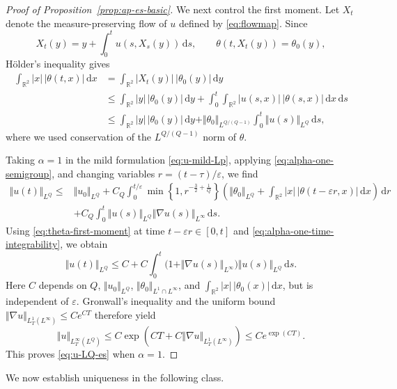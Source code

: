 \documentclass[reqno,11pt,a4paper]{amsart}
\newcommand{\dd}{\mathrm{d}}
\begin{document}
\begin{proof}[Proof of Proposition~\ref{prop:ap-es-basic}]
We next control the first moment.
Let $X_t$ denote the measure-preserving flow of $u$
defined by \eqref{eq:flowmap}. Since
\[
  X_t(y)=y+\int_0^t u(s,X_s(y))\,\dd s,
  \qquad
  \theta(t,X_t(y))=\theta_0(y),
\]
H\"older's inequality gives
\begin{equation}\label{eq:theta-first-moment}
\begin{aligned}
  \int_{\mathbb R^2}|x|\,|\theta(t,x)|\,\dd x
  &=
  \int_{\mathbb R^2}|X_t(y)|\,|\theta_0(y)|\,\dd y
  \\
  &\leq
  \int_{\mathbb R^2}|y|\,|\theta_0(y)|\,\dd y
  +\int_0^t\int_{\mathbb R^2}
    |u(s,x)|\,|\theta(s,x)|\,\dd x\,\dd s
  \\
  &\leq
  \int_{\mathbb R^2}|y|\,|\theta_0(y)|\,\dd y
  +\Vert \theta_0\Vert _{L^{Q/(Q-1)}}
    \int_0^t\Vert u(s)\Vert _{L^Q}\,\dd s,
\end{aligned}
\end{equation}
where we used conservation of the
$L^{Q/(Q-1)}$ norm of $\theta$.

Taking $\alpha=1$ in the mild formulation
\eqref{eq:u-mild-Lp}, applying
\eqref{eq:alpha-one-semigroup}, and changing variables
$r=(t-\tau)/\varepsilon$, we find
\begin{align*}
  \Vert u(t)\Vert _{L^Q}
  \leq {}&
  \Vert u_0\Vert _{L^Q}
  +C_Q\int_0^{t/\varepsilon}
    \min\left\{1,r^{-\frac32+\frac1Q}\right\}
    \left(
      \Vert \theta_0\Vert _{L^Q}
      +\int_{\mathbb R^2}
        |x|\,|\theta(t-\varepsilon r,x)|\,\dd x
    \right)\,\dd r
  \\
  &+
  C_Q\int_0^t
    \Vert u(s)\Vert _{L^Q}\Vert \nabla u(s)\Vert _{L^\infty}\,\dd s.
\end{align*}
Using \eqref{eq:theta-first-moment} at time
$t-\varepsilon r\in[0,t]$ and
\eqref{eq:alpha-one-time-integrability}, we obtain
\[
  \Vert u(t)\Vert _{L^Q}
  \leq
  C+C\int_0^t
    \bigl(1+\Vert \nabla u(s)\Vert _{L^\infty}\bigr)
    \Vert u(s)\Vert _{L^Q}\,\dd s.
\]
Here $C$ depends on $Q$, $\Vert u_0\Vert _{L^Q}$,
$\Vert \theta_0\Vert _{L^1\cap L^\infty}$, and
$\int_{\mathbb R^2}|x|\,|\theta_0(x)|\,\dd x$,
but is independent of $\varepsilon$.
Gronwall's inequality and the uniform bound
$\Vert \nabla u\Vert _{L^1_T(L^\infty)}\leq Ce^{CT}$
therefore yield
\[
  \Vert u\Vert _{L^\infty_T(L^Q)}
  \leq
  C\exp\left(
    CT+C\Vert \nabla u\Vert _{L^1_T(L^\infty)}
  \right)
  \leq Ce^{\exp(CT)}.
\]
This proves \eqref{eq:u-LQ-es} when $\alpha=1$.
\end{proof}

We now establish uniqueness in the following class.
\end{document}

